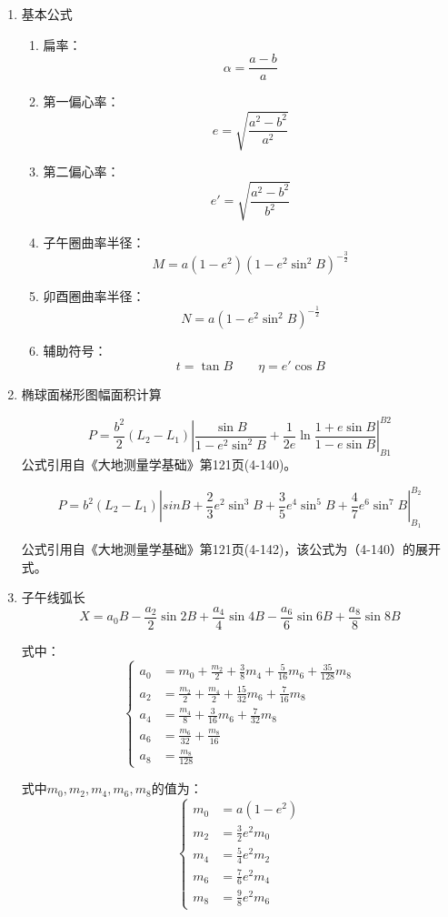 \begin{enumerate}

 \item 基本公式

\begin{enumerate}
\item 扁率：
$$\alpha=\frac{a-b}{a}$$

\item 第一偏心率：
$$e=\sqrt{\frac{a^2-b^2}{a^2}}$$

\item 第二偏心率：
$$e'=\sqrt{\frac{a^{2}-b^{2}}{b^{2}}}$$

\item 子午圈曲率半径：
$$M=a(1-e^2)(1-e^2\sin ^2 B)^{-\frac{3}{2}}$$

\item 卯酉圈曲率半径：
$$N=a(1-e^2\sin ^2 B)^{-\frac{1}{2}}$$

\item 辅助符号：
$$t=\tan B\qquad\eta=e'\cos B$$
\end{enumerate}

\item 椭球面梯形图幅面积计算

$$P = \frac{b^2}{2}(L_2 - L_1) \left | \frac{\sin B}{1-e^2\sin^2 B} + \frac{1}{2e}\ln \frac{1+e\sin B}{1-e\sin B}\right |_{B1} ^{B2} $$
公式引用自《大地测量学基础》第121页(4-140)。

$$P=b^2(L_2 - L_1) \left | sinB + \frac{2}{3}e^2 \sin ^3 B + \frac{3}{5}e^4 \sin^5 B + \frac{4}{7}e^6 \sin ^7 B \right | _{B_1} ^{B_2}$$

公式引用自《大地测量学基础》第121页(4-142)，该公式为（4-140）的展开式。

\item 子午线弧长
$$X=a_0 B - \frac{a_2}{2}\sin 2B + \frac{a_4}{4}\sin 4B 
- \frac{a_6}{6} \sin 6B  + \frac{a_8}{8}\sin 8B$$

式中：
\[
\left \{ \begin{aligned}
a_0 &= m_0 + \frac{m_2}{2} + \frac{3}{8}m_4 + \frac{5}{16}m_6 + \frac{35}{128}m_8  \\
a_2 &= \frac{m_2}{2} + \frac{m_4}{2} + \frac{15}{32}m_6 + \frac{7}{16}m_8  \\
a_4 &= \frac{m_4}{8} + \frac{3}{16}m_6 + \frac{7}{32}m_8  \\
a_6 &= \frac{m_6}{32} + \frac{m_8}{16}  \\
a_8 &= \frac{m_8}{128}
\end{aligned} \right.
\]

式中$m_0, m_2, m_4, m_6, m_8$的值为：
\[
\left \{ \begin{aligned}
m_0 &= a(1-e^2) \\
m_2 &= \frac{3}{2}e^2 m_0  \\
m_4 &= \frac{5}{4}e^2 m_2   \\
m_6 &= \frac{7}{6}e^2 m_4   \\
m_8 &= \frac{9}{8}e^2 m_6 
\end{aligned} \right.
\]


\end{enumerate}
